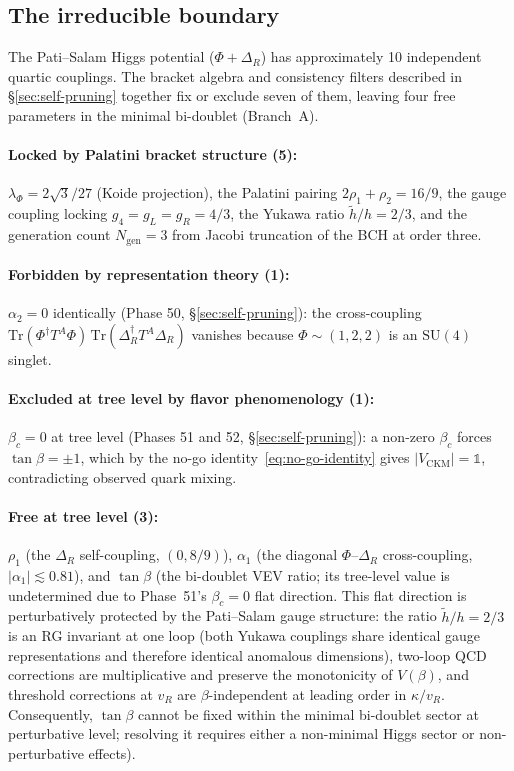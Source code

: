 \documentclass[11pt,a4paper]{article}
\theoremstyle{plain}
\theoremstyle{definition}
\theoremstyle{remark}
\begin{document}
\subsection{The irreducible boundary}
\label{sec:boundary}

The Pati--Salam Higgs potential ($\Phi + \Delta_R$) has approximately
10 independent quartic couplings.  The bracket algebra and consistency
filters described in \S\ref{sec:self-pruning} together fix or exclude
seven of them, leaving four free parameters in the minimal bi-doublet
(Branch~A).

\paragraph{Locked by Palatini bracket structure (5):}
$\lambda_\Phi = 2\sqrt{3}/27$ (Koide projection),
the Palatini pairing $2\rho_1 + \rho_2 = 16/9$,
the gauge coupling locking $g_4 = g_L = g_R = 4/3$,
the Yukawa ratio $\tilde{h}/h = 2/3$,
and the generation count $N_{\mathrm{gen}} = 3$ from Jacobi
truncation of the BCH at order three.

\paragraph{Forbidden by representation theory (1):}
$\alpha_2 = 0$ identically (Phase 50, \S\ref{sec:self-pruning}):
the cross-coupling
$\mathrm{Tr}(\Phi^\dagger T^A \Phi)\,
 \mathrm{Tr}(\Delta_R^\dagger T^A \Delta_R)$ vanishes
because $\Phi \sim (1,2,2)$ is an $\mathrm{SU}(4)$ singlet.

\paragraph{Excluded at tree level by flavor phenomenology (1):}
$\beta_c = 0$ at tree level (Phases 51 and 52,
\S\ref{sec:self-pruning}): a non-zero $\beta_c$ forces
$\tan\beta = \pm 1$, which by the no-go
identity~\eqref{eq:no-go-identity} gives
$|V_{\mathrm{CKM}}| = \mathbb{1}$, contradicting observed quark mixing.

\paragraph{Free at tree level (3):}
$\rho_1$ (the $\Delta_R$ self-coupling, $(0, 8/9)$),
$\alpha_1$ (the diagonal $\Phi$--$\Delta_R$ cross-coupling,
$|\alpha_1| \lesssim 0.81$),
and $\tan\beta$ (the bi-doublet VEV ratio; its tree-level value is
undetermined due to Phase~51's $\beta_c = 0$ flat direction.
This flat direction is perturbatively protected by the Pati--Salam
gauge structure: the ratio $\tilde{h}/h = 2/3$ is an RG invariant
at one loop (both Yukawa couplings share identical gauge
representations and therefore identical anomalous dimensions),
two-loop QCD corrections are multiplicative and preserve the
monotonicity of $V(\beta)$, and threshold corrections at $v_R$
are $\beta$-independent at leading order in $\kappa/v_R$.
Consequently, $\tan\beta$ cannot be fixed within the minimal
bi-doublet sector at perturbative level; resolving it requires
either a non-minimal Higgs sector or non-perturbative effects).
\end{document}
